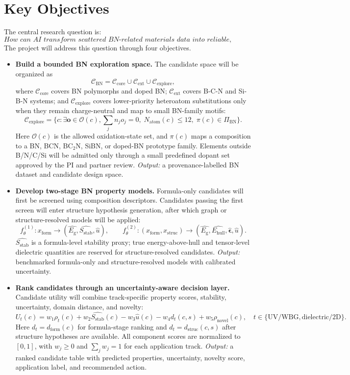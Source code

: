 \documentclass[10pt,a4paper]{article}
\newcommand{\eg}{E_{\mathrm{g}}}
\newcommand{\ehull}{E_{\mathrm{hull}}}
\newcommand{\form}{x_{\mathrm{form}}}
\newcommand{\struc}{x_{\mathrm{struc}}}
\newcommand{\unc}{u}
\newcommand{\stab}{S_{\mathrm{stab}}}
\newcommand{\domainf}{d_{\mathrm{form}}}
\newcommand{\domains}{d_{\mathrm{struc}}}
\newcommand{\utility}{U}
\newcommand{\novel}{\rho_{\mathrm{novel}}}
\begin{document}
\section{Key Objectives}
The central research question is:
\[
  \textit{How can AI transform scattered BN-related materials data into reliable, uncertainty-aware research decisions?}
\]
The project will address this question through four objectives.
\begin{itemize}[leftmargin=*]
  \item \textbf{Build a bounded BN exploration space.} The candidate space will be organized as
  \[
    \mathcal{C}_{\mathrm{BN}}=
    \mathcal{C}_{\mathrm{core}}\cup\mathcal{C}_{\mathrm{ext}}\cup\mathcal{C}_{\mathrm{explore}},
  \]
  where $\mathcal{C}_{\mathrm{core}}$ covers BN polymorphs and doped BN;
  $\mathcal{C}_{\mathrm{ext}}$ covers B-C-N and Si-B-N systems; and
  $\mathcal{C}_{\mathrm{explore}}$ covers lower-priority heteroatom substitutions only when they remain charge-neutral and map to small BN-family motifs:
  \[
    \mathcal{C}_{\mathrm{explore}}=
    \{c:\exists \mathbf{o}\in\mathcal{O}(c),\sum_j n_j o_j=0,\;
    N_{\mathrm{atom}}(c)\le 12,\;\pi(c)\in\Pi_{\mathrm{BN}}\}.
  \]
  Here $\mathcal{O}(c)$ is the allowed oxidation-state set, and $\pi(c)$ maps a composition to a BN, BCN, BC$_2$N, SiBN, or doped-BN prototype family. Elements outside B/N/C/Si will be admitted only through a small predefined dopant set approved by the PI and partner review.
  \textit{Output:} a provenance-labelled BN dataset and candidate design space.

  \item \textbf{Develop two-stage BN property models.} Formula-only candidates will first be screened using composition descriptors. Candidates passing the first screen will enter structure hypothesis generation, after which graph or structure-resolved models will be applied:
  \[
    f_{\theta}^{(1)}:\form\rightarrow(\hat{\eg},\hat{\stab},\hat{\unc}),
    \qquad
    f_{\theta}^{(2)}:(\form,\struc)\rightarrow
    (\hat{\eg},\hat{\ehull},\hat{\boldsymbol{\epsilon}},\hat{\unc}).
  \]
  $\hat{\stab}$ is a formula-level stability proxy; true energy-above-hull and tensor-level dielectric quantities are reserved for structure-resolved candidates.
  \textit{Output:} benchmarked formula-only and structure-resolved models with calibrated uncertainty.

  \item \textbf{Rank candidates through an uncertainty-aware decision layer.} Candidate utility will combine track-specific property scores, stability, uncertainty, domain distance, and novelty:
  \[
    \utility_t(c)=w_1\rho_t(c)+w_2\hat{\stab}(c)-w_3\hat{\unc}(c)
    -w_4 d_t(c,s)+w_5\novel(c),\quad
    t\in\{\mathrm{UV/WBG},\mathrm{dielectric/2D}\}.
  \]
  Here $d_t=\domainf(c)$ for formula-stage ranking and $d_t=\domains(c,s)$ after structure hypotheses are available. All component scores are normalized to $[0,1]$, with $w_j\ge0$ and $\sum_j w_j=1$ for each application track.
  \textit{Output:} a ranked candidate table with predicted properties, uncertainty, novelty score, application label, and recommended action.


\end{itemize}
\end{document}
